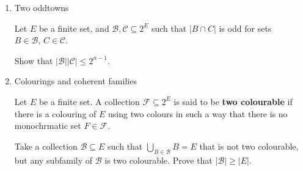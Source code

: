 \documentclass[kulak]{tplt}
\theoremstyle{definition}
\newcommand{\CC}{\mathcal C}
\newcommand{\BB}{\mathcal B}
\newcommand{\FF}{\mathcal F}
\begin{document}
\begin{enumerate}
\item Two oddtowns

Let $E$ be a finite set, and $\BB, \CC\subseteq 2^E$ such that $|B\cap C|$ is odd for sets $B\in \BB, \, C \in \CC$.

Show that $|\BB| |\CC| \leq 2^{n-1}$.


\item Colourings and coherent families

Let $E$ be a finite set.
A collection $\FF \subseteq 2^E $ is said to be \textbf{two colourable} if there is a colouring of $E$ using two colours in such a way that there is no monochrmatic set $F \in \FF$.

Take a collection $\BB \subseteq E$ such that $\bigcup_{B \in \BB} B = E$ that is not two colourable, but any subfamily of $\BB$ is two colourable.
Prove that $|\BB| \geq |E|$.



\end{enumerate}
\end{document}
